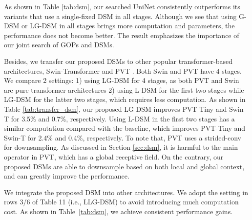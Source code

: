 \documentclass[runningheads]{llncs}
\begin{document}
As shown in Table \ref{tab:dsm}, our searched UniNet consistently outperforms its variants that use a single-fixed DSM in all stages. Although we see that using G-DSM or LG-DSM in all stages brings more computation and parameters, the performance does not become better. The result emphasizes the importance of our joint search of GOPs and DSMs.


Besides, we transfer our proposed DSMs to other popular transformer-based architectures, Swin-Transformer \cite{swin} and PVT \cite{pvt}. Both Swin and PVT have 4 stages. We compare 2 settings: 1) using LG-DSM for 4 stages, as both PVT and Swin are pure transformer architectures 2) using L-DSM for the first two stages while LG-DSM for the latter two stages, which requires less computation. As shown in Table \ref{tab:transfer_dsm}, our proposed LG-DSM improves PVT-Tiny and Swin-T for 3.5\% and 0.7\%, respectively. Using L-DSM in the first two stages has a similar computation compared with the baseline, which improves PVT-Tiny and Swin-T for 2.4\% and 0.4\%, respectively.
To note that, PVT uses a strided-conv for downsampling. As discussed in Section \ref{sec:dsm}, it is harmful to the main operator in PVT, which has a global receptive field. On the contrary, our proposed DSMs are able to downsample based on both local and global context, and can greatly improve the performance.

We integrate the proposed DSM into other architectures. We adopt the setting in rows 3/6 of Table 11 (i.e., LLG-DSM) to avoid introducing much computation cost. As shown in Table~\ref{tab:dsm}, we achieve consistent performance gains.
\end{document}
